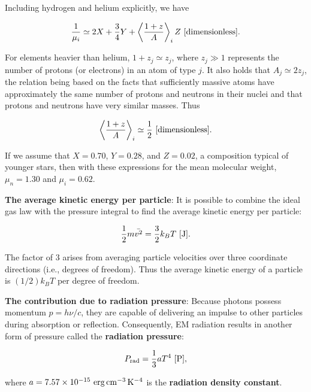 \documentclass[a4paper,10pt]{article}
\begin{document}
{\noindent}Including hydrogen and helium explicitly, we have

\begin{align*}
    \frac{1}{\mu_i} \simeq 2X + \frac{3}{4}Y + \left\langle\frac{1+z}{A}\right\rangle_i Z ~ [{\rm dimensionless}].
\end{align*}

{\noindent}For elements heavier than helium, $1+z_j\simeq z_j$, where $z_j\gg1$ represents the number of protons (or electrons) in an atom of type $j$. It also holds that $A_j\simeq2z_j$, the relation being based on the facts that sufficiently massive atoms have approximately the same number of protons and neutrons in their nuclei and that protons and neutrons have very similar masses. Thus

\begin{align*}
    \left\langle\frac{1+z}{A}\right\rangle_i \simeq \frac{1}{2} ~ [{\rm dimensionless}].
\end{align*}

{\noindent}If we assume that $X=0.70$, $Y=0.28$, and $Z=0.02$, a composition typical of younger stars, then with these expressions for the mean molecular weight, $\mu_n=1.30$ and $\mu_i=0.62$. 

{\noindent}\textbf{The average kinetic energy per particle}: It is possible to combine the ideal gas law with the pressure integral to find the average kinetic energy per particle: 

\begin{align*}
    \frac{1}{2}m\bar{v^2} = \frac{3}{2}k_BT ~ [{\rm J}].
\end{align*}

{\noindent}The factor of $3$ arises from averaging particle velocities over three coordinate directions (i.e., degrees of freedom). Thus the average kinetic energy of a particle is $(1/2)k_BT$ per degree of freedom.

{\noindent}\textbf{The contribution due to radiation pressure}: Because photons possess momentum $p=h\nu/c$, they are capable of delivering an impulse to other particles during absorption or reflection. Consequently, EM radiation results in another form of pressure called the \textbf{radiation pressure}: 

\begin{align*}
    P_{\rm rad} = \frac{1}{3}aT^4 ~ [{\rm P}],
\end{align*}

{\noindent}where $a=7.57\times10^{-15}~{\rm erg\,cm^{-3}\,K^{-4}}$ is the \textbf{radiation density constant}.
\end{document}
